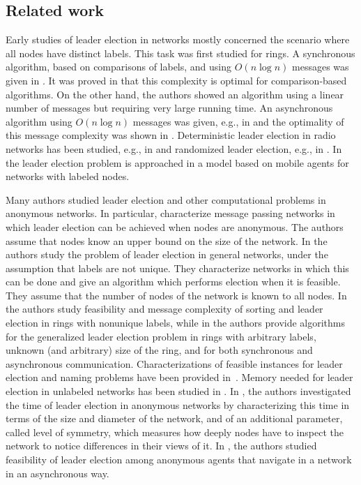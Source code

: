 \documentclass[a4paper,10pt]{article}
\begin{document}
\subsection{Related work} \label{subsec:related_work}
Early studies of leader election in networks mostly concerned the scenario where all nodes have distinct labels.
This task was first studied for rings.
A synchronous algorithm, based on comparisons of labels, and using
$O(n \log n)$ messages was given in \cite{HS}. It was proved in \cite{FL} that
this complexity is optimal for comparison-based algorithms. On the other hand, the authors showed
an algorithm using a linear number of messages but requiring very large running time.
An asynchronous algorithm using $O(n \log n)$ messages was given, e.g., in \cite{P} and
the optimality of this message complexity was shown in \cite{B}. Deterministic leader election in radio networks has been studied, e.g., 
in \cite{JKZ,KP,NO} and randomized leader election, e.g., in \cite{Wil}. In \cite{HKMMJ} the leader election problem is
approached in a model based on mobile agents for networks with labeled nodes.

Many authors \cite{An,ASW,AtSn,BV,DKMP,Kr,KKV,Saka,YK,YK3} studied leader election
and other computational problems
in anonymous networks. In particular, \cite{BSVCGS,YK3} characterize message passing networks in which
leader election can be achieved when nodes are anonymous. 
The authors assume that nodes know an upper bound on the size of the network. In \cite{YK2} the authors study
the problem of leader election in general networks, under the assumption that labels are
not unique. They characterize networks in which this can be done and give an algorithm
which performs election when it is feasible. They assume that the number of nodes of the
network is known to all nodes. In
 \cite{FKKLS}  the authors
study feasibility and message complexity of sorting and leader election in rings with
nonunique labels, while in \cite{DoPe} the authors provide algorithms for the
generalized leader election problem in rings with arbitrary labels,
unknown (and arbitrary) size of the ring, and for both
synchronous and asynchronous communication. 
Characterizations of feasible instances for leader election and naming problems have been provided in~\cite{C,CMM,CM}.
Memory needed for leader election in unlabeled networks has been studied in \cite{FP}. 
In \cite{FP1}, the authors investigated the time of leader election in anonymous networks
by characterizing this time in terms of the size and diameter of the network, and of an additional
parameter, called level of symmetry, which measures how deeply nodes have to inspect the network to notice differences in their views of it.
In \cite{DP1}, the authors studied feasibility of leader election among anonymous agents that
navigate in a network in an asynchronous way.
\end{document}
